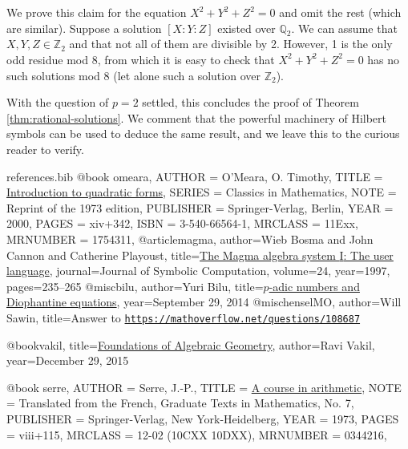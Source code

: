 \documentclass[10pt,a4paper]{amsart}
\numberwithin{equation}{section}
\numberwithin{figure}{section}
\numberwithin{table}{section}
\theoremstyle{definition}
\theoremstyle{plain}
\theoremstyle{remark}
\theoremstyle{plain}
\theoremstyle{definition}
\theoremstyle{plain}
\theoremstyle{plain}
\newcommand{\Z}{\mathbb{Z}}
\newcommand{\Q}{\mathbb{Q}}
\begin{document}
	We prove this claim for the equation $X^2 + Y^2 + Z^2 = 0$ and omit the rest (which are similar). Suppose a solution $[X:Y:Z]$ existed over $\Q_2$. We can assume that $X,Y,Z\in \Z_2$ and that not all of them are divisible by 2. However, 1 is the only odd residue mod 8, from which it is easy to check that $X^2 + Y^2 + Z^2 = 0$ has no such solutions mod 8 (let alone such a solution over $\Z_2$).
	
	With the question of $p=2$ settled, this concludes the proof of Theorem \ref{thm:rational-solutions}. We comment that the powerful machinery of Hilbert symbols can be used to deduce the same result, and we leave this to the curious reader to verify.
	\begin{filecontents}{references.bib}
		@book {omeara,
			AUTHOR = {O'Meara, O. Timothy},
			TITLE = {\href{https://link.springer.com/book/10.1007\%2F978-3-642-62031-7}{Introduction to quadratic forms}},
			SERIES = {Classics in Mathematics},
			NOTE = {Reprint of the 1973 edition},
			PUBLISHER = {Springer-Verlag, Berlin},
			YEAR = {2000},
			PAGES = {xiv+342},
			ISBN = {3-540-66564-1},
			MRCLASS = {11Exx},
			MRNUMBER = {1754311},
		}
		@article{magma,
			author={Wieb Bosma and John Cannon and Catherine Playoust},
			title={\href{http://www.sciencedirect.com/science/article/pii/S074771719690125X}{The Magma algebra system {I}: The user language}},
			journal={Journal of Symbolic Computation},
			volume={24},
			year={1997},
			pages={235--265}
		}
		@misc{bilu,
			author={Yuri Bilu},
			title={\href{https://www.math.u-bordeaux.fr/~abesheno/bilu.pdf}{$p$-adic numbers and Diophantine equations}},
			year={September 29, 2014}
		}
		@misc{henselMO,
			author={Will Sawin},
			title={Answer to \href{https://mathoverflow.net/questions/108687}{\texttt{https://mathoverflow.net/questions/108687}}}
		}
		
		@book{vakil,
			title={\href{http://math.stanford.edu/~vakil/216blog/index.html}{Foundations of Algebraic Geometry}},
			author={Ravi Vakil},
			year={December 29, 2015}
		}

@book {serre,
    AUTHOR = {Serre, J.-P.},
     TITLE = {\href{https://link.springer.com/book/10.1007\%2F978-1-4684-9884-4}{A course in arithmetic}},
      NOTE = {Translated from the French,
              Graduate Texts in Mathematics, No. 7},
 PUBLISHER = {Springer-Verlag, New York-Heidelberg},
      YEAR = {1973},
     PAGES = {viii+115},
   MRCLASS = {12-02 (10CXX 10DXX)},
  MRNUMBER = {0344216},
}
	\end{filecontents}
	
	
	
	
\end{document}
